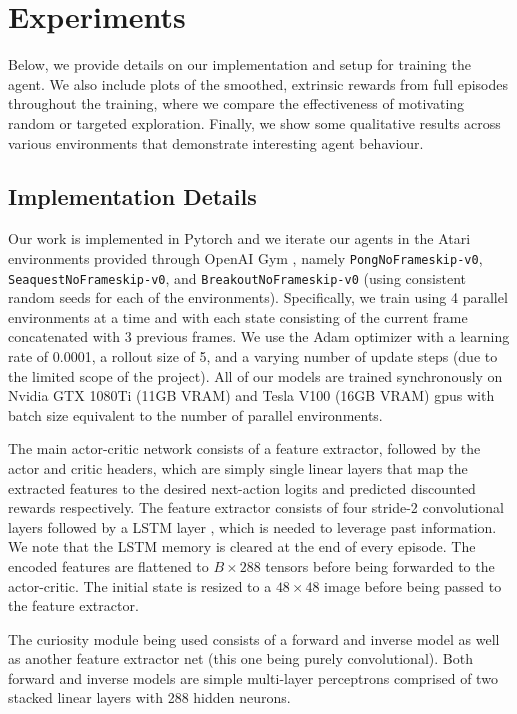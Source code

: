 \documentclass{article}
\begin{document}
\section{Experiments}
Below, we provide details on our implementation and setup for training the agent. We also include plots of the smoothed, extrinsic rewards from full episodes throughout the training, where we compare the effectiveness of motivating random or targeted exploration. Finally, we show some qualitative results across various environments that demonstrate interesting agent behaviour.

\subsection{Implementation Details}
Our work is implemented in Pytorch and we iterate our agents in the Atari environments provided through OpenAI Gym \cite{ppo, gym}, namely \texttt{PongNoFrameskip-v0}, \texttt{SeaquestNoFrameskip-v0}, and \texttt{BreakoutNoFrameskip-v0} (using consistent random seeds for each of the environments). Specifically, we train using 4 parallel environments at a time and with each state consisting of the current frame concatenated with 3 previous frames. We use the Adam optimizer \cite{adam} with a learning rate of 0.0001, a rollout size of 5, and a varying number of update steps (due to the limited scope of the project). All of our models are trained synchronously on Nvidia GTX 1080Ti (11GB VRAM) and Tesla V100 (16GB VRAM) gpus with batch size equivalent to the number of parallel environments.

The main actor-critic network consists of a feature extractor, followed by the actor and critic headers, which are simply single linear layers that map the extracted features to the desired next-action logits and predicted discounted rewards respectively. The feature extractor consists of four stride-2 convolutional layers followed by a LSTM layer \cite{lstm}, which is needed to leverage past information. We note that the LSTM memory is cleared at the end of every episode. The encoded features are flattened to $B\times 288$ tensors before being forwarded to the actor-critic. The initial state is resized to a $48\times 48$ image before being passed to the feature extractor.

The curiosity module being used consists of a forward and inverse model as well as another feature extractor net (this one being purely convolutional). Both forward and inverse models are simple multi-layer perceptrons comprised of two stacked linear layers with 288 hidden neurons.
\end{document}
